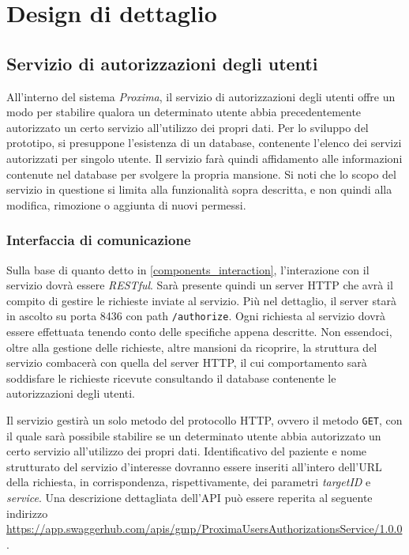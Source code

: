 \documentclass[a4paper,12pt]{report}
\begin{document}
\chapter{Design di dettaglio}

\section{Servizio di autorizzazioni degli utenti} \label{users_authorizations_design}

All'interno del sistema \emph{Proxima}, il servizio di autorizzazioni degli utenti offre un modo per stabilire qualora un determinato utente abbia precedentemente autorizzato un certo servizio all'utilizzo dei propri dati. Per lo sviluppo del prototipo, si presuppone l'esistenza di un database, contenente l'elenco dei servizi autorizzati per singolo utente. Il servizio farà quindi affidamento alle informazioni contenute nel database per svolgere la propria mansione. Si noti che lo scopo del servizio in questione si limita alla funzionalità sopra descritta, e non quindi alla modifica, rimozione o aggiunta di nuovi permessi. 

\subsection{Interfaccia di comunicazione}

Sulla base di quanto detto in \autoref{components_interaction}, l'interazione con il servizio dovrà essere \emph{RESTful}. Sarà presente quindi un server HTTP che avrà il compito di gestire le richieste inviate al servizio. Più nel dettaglio, il server starà in ascolto su porta 8436 con path \texttt{/authorize}. Ogni richiesta al servizio dovrà essere effettuata tenendo conto delle specifiche appena descritte. Non essendoci, oltre alla gestione delle richieste, altre mansioni da ricoprire, la struttura del servizio combacerà con quella del server HTTP, il cui comportamento sarà soddisfare le richieste ricevute consultando il database contenente le autorizzazioni degli utenti.

Il servizio gestirà un solo metodo del protocollo HTTP, ovvero il metodo \texttt{GET}, con il quale sarà possibile stabilire se un determinato utente abbia autorizzato un certo servizio all'utilizzo dei propri dati. Identificativo del paziente e nome strutturato del servizio d'interesse dovranno essere inseriti all'intero dell'URL della richiesta, in corrispondenza, rispettivamente, dei parametri \emph{targetID} e \emph{service}. Una descrizione dettagliata dell'API può essere reperita al seguente indirizzo \url{https://app.swaggerhub.com/apis/gmp/ProximaUsersAuthorizationsService/1.0.0}.
\end{document}
